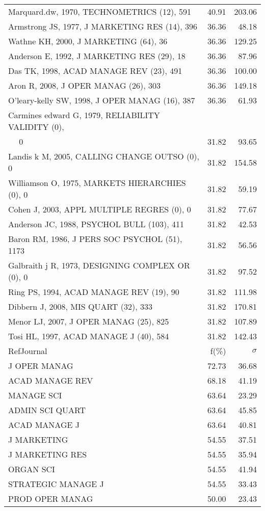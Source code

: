 \documentclass[a4paper,11pt]{report}
\begin{document}
\begin{landscape}
\begin{table}[!ht]
{\begin{tabular}{|l r r|}
Marquard.dw, 1970, TECHNOMETRICS (12), 591 & 40.91 & 203.06\\
Armstrong JS, 1977, J MARKETING RES (14), 396 & 36.36 & 48.18\\
Wathne KH, 2000, J MARKETING (64), 36 & 36.36 & 129.25\\
Anderson E, 1992, J MARKETING RES (29), 18 & 36.36 & 87.96\\
Das TK, 1998, ACAD MANAGE REV (23), 491 & 36.36 & 100.00\\
Aron R, 2008, J OPER MANAG (26), 303 & 36.36 & 149.18\\
O'leary-kelly SW, 1998, J OPER MANAG (16), 387 & 36.36 & 61.93\\
Carmines edward G, 1979, RELIABILITY VALIDITY (0), &  & \\
$\quad$ 0 & 31.82 & 93.65\\
Landis k M, 2005, CALLING CHANGE OUTSO (0), 0 & 31.82 & 154.58\\
Williamson O, 1975, MARKETS HIERARCHIES (0), 0 & 31.82 & 59.19\\
Cohen J, 2003, APPL MULTIPLE REGRES (0), 0 & 31.82 & 77.67\\
Anderson JC, 1988, PSYCHOL BULL (103), 411 & 31.82 & 42.53\\
Baron RM, 1986, J PERS SOC PSYCHOL (51), 1173 & 31.82 & 56.56\\
Galbraith j R, 1973, DESIGNING COMPLEX OR (0), 0 & 31.82 & 97.52\\
Ring PS, 1994, ACAD MANAGE REV (19), 90 & 31.82 & 111.98\\
Dibbern J, 2008, MIS QUART (32), 333 & 31.82 & 170.81\\
Menor LJ, 2007, J OPER MANAG (25), 825 & 31.82 & 107.89\\
Tosi HL, 1997, ACAD MANAGE J (40), 584 & 31.82 & 142.43\\
\hline
\hline
RefJournal & f(\%) & $\sigma$\\
\hline
J OPER MANAG & 72.73 & 36.68\\
ACAD MANAGE REV & 68.18 & 41.19\\
MANAGE SCI & 63.64 & 23.29\\
ADMIN SCI QUART & 63.64 & 45.85\\
ACAD MANAGE J & 63.64 & 40.81\\
J MARKETING & 54.55 & 37.51\\
J MARKETING RES & 54.55 & 35.94\\
ORGAN SCI & 54.55 & 41.94\\
STRATEGIC MANAGE J & 54.55 & 33.43\\
PROD OPER MANAG & 50.00 & 23.43\\
\hline
\end{tabular}
}
\end{table}


\end{landscape}
\end{document}
